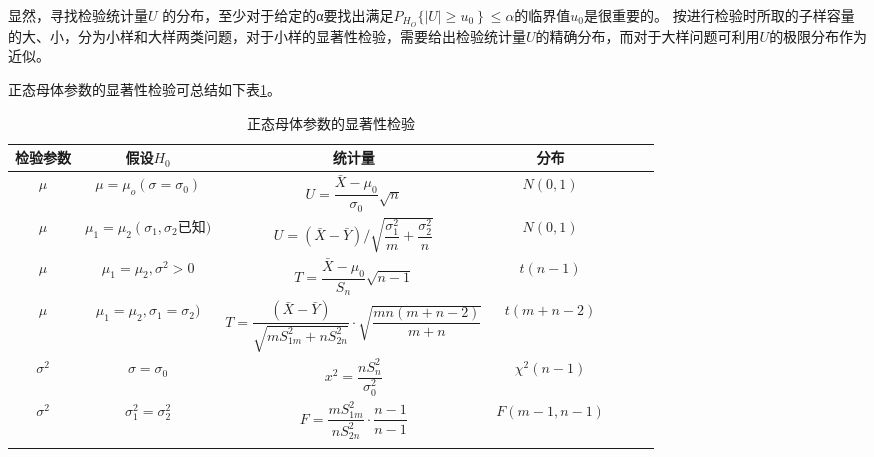 \begin{enumerate}[1)]
\begin{myexample}
			显然，寻找检验统计量$ U $ 的分布，至少对于给定的α要找出满足$ P_{H_O}\{|U|\left.\geqslant u_{0}\right\} \leq \alpha $的临界值$ u_0 $是很重要的。
			按进行检验时所取的子样容量的大、小，分为小样和大样两类问题，对于小样的显著性检验，需要给出检验统计量$ U $的精确分布，而对于大样问题可利用$ U $的极限分布作为近似。
			
			正态母体参数的显著性检验可总结如下表\ref{tabel2}。
		\end{myexample}
			\begin{table}[htb!]
			\caption{正态母体参数的显著性检验}  %
			\begin{center}   %
				\begin{tabular}{ccccccc}  %
					\toprule    %
					检验参数   & 假设$ H_0 $  & 统计量 & 分布 &  \\ \midrule  %
					$ \mu  $  & $ \mu=\mu_{o}(\sigma=\sigma_0) $   & $ U=\dfrac{\bar{X}-\mu_{0}}{\sigma_{0}} \sqrt{n} $    & $ N(0,1)  $  \vspace{0.5em} \\
					$ \mu  $  & $   \mu_{1}=\mu_{2}\left(\sigma_{1}, \sigma_{2}\right. \text{已知} )  $    & $ U=(\bar{X}-\bar{Y}) / \sqrt{\dfrac{\sigma_{1}^{2}}{m}+\dfrac{\sigma_{2}^{2}}{n}}  $    & 
					$ N(0,1)  $      \vspace{0.5em} \\ 
					$ \mu  $  & $   \mu_{1}=\mu_{2},\sigma^2 > 0   $    & $ T=\dfrac{\bar{X}-\mu_{0}}{S_{n}} \sqrt{n-1}  $    & 	$ t(n-1)  $     \vspace{0.5em}  \\ 
					$ \mu  $  & $   \mu_{1}=\mu_{2},\sigma_{1} = \sigma_{2} )  $    & $ T=\dfrac{(\bar{X}-\bar{Y})}{\sqrt{m S_{1 m}^{2}+n S_{2 n}^{2}}} \cdot \sqrt{\dfrac{m n(m+n-2)}{m+n}} $    & 	$t\left(m + n -2\right) $     \vspace{0.5em}  \\ 
					\midrule
					$\sigma^2 $  &   $  \sigma = \sigma_{0}  $ & $ x^{2}=\dfrac{n S_{n}^{2}}{\sigma_{0}^{2}} $    &
					$ \chi^{2}(n-1) $    \vspace{0.5em} \\
					$\sigma^2 $  &   $  \sigma_{1} ^2= \sigma_{2}^2 $ & $ F=\dfrac{m S_{1 m}^{2}}{n S_{2 n}^{2}} \cdot \dfrac{n-1}{n-1} $    & $ F(m-1, n-1) $   \\ 
					\bottomrule   %
					\label{tabel2}
				\end{tabular}
			\end{center}
		\end{table}


\end{enumerate}
